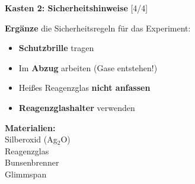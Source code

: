 \documentclass[10pt, a4paper]{article}
\newcommand{\lsg}[1]{\textcolor{loesung}{\textbf{#1}}}
\newcommand{\punktebox}[1]{\hfill\small\textcolor{mittelgrau}{[#1/#1]}}
\newcommand{\operator}[1]{\textbf{\textcolor{fachfarbe}{#1}}}
\begin{document}
\begin{sicherheitsbox}
\textbf{\textcolor{warnung}{Kasten 2: Sicherheitshinweise}} \punktebox{4}\\[0.3em]
\begin{minipage}[t]{0.65\textwidth}
\operator{Ergänze} die Sicherheitsregeln für das Experiment:
\begin{itemize}[leftmargin=1.5em, itemsep=6pt]
    \item[\textcolor{warnung}{\textbf{!}}] \lsg{Schutzbrille} tragen
    \item[\textcolor{warnung}{\textbf{!}}] Im \lsg{Abzug} arbeiten (Gase entstehen!)
    \item[\textcolor{warnung}{\textbf{!}}] Heißes Reagenzglas \lsg{nicht anfassen}
    \item[\textcolor{warnung}{\textbf{!}}] \lsg{Reagenzglashalter} verwenden
\end{itemize}
\end{minipage}%
\hfill
\begin{minipage}[t]{0.3\textwidth}
\centering
\textbf{Materialien:}\\
{\footnotesize
Silberoxid (Ag$_2$O)\\
Reagenzglas\\
Bunsenbrenner\\
Glimmspan
}
\end{minipage}
\end{sicherheitsbox}

\vspace{2pt}

\end{document}
